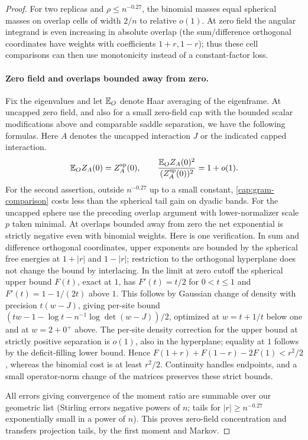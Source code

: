 \begin{proof}
For two replicas and \(\rho\le n^{-0.27}\), the binomial masses equal
spherical masses on overlap cells of width \(2/n\) to relative \(o(1)\). At
zero field the angular integrand is even increasing in absolute overlap (the
sum/difference orthogonal coordinates have weights with coefficients
\(1+r,1-r\)); thus these cell comparisons can then use monotonicity instead of
a constant-factor loss.

\paragraph{Zero field and overlaps bounded away from zero.}
Fix the eigenvalues and let \(\mathbb E_O\) denote Haar averaging of the eigenframe.
At uncapped zero field, and also for a small zero-field cap with the bounded
scalar modifications above and comparable saddle separation, we have the
following formulas. Here \(A\) denotes the uncapped interaction \(J\) or
the indicated capped interaction.
\[
 \mathbb E_O Z_A(0)=Z_A^{\rm sp}(0),\qquad
 \frac{\mathbb E_O Z_A(0)^2}{(Z_A^{\rm sp}(0))^2}=1+o(1).
\]
For the second assertion, outside \(n^{-0.27}\) up to a small constant,
\eqref{cap:gram-comparison} costs less than the spherical tail gain on dyadic
bands. For the uncapped sphere use the preceding overlap argument with
lower-normalizer scale \(p\) taken minimal. At overlaps bounded away from
zero the net exponential is strictly negative even with binomial weights.
Here is one verification. In sum and difference orthogonal coordinates,
upper exponents are bounded by the spherical free energies at \(1+|r|\) and
\(1-|r|\); restriction to the orthogonal hyperplane does not change the
bound by interlacing. In the limit at zero cutoff the spherical upper bound
\(F(t)\), exact at \(1\), has \(F'(t)=t/2\) for \(0<t\le1\) and
\(F'(t)=1-1/(2t)\) above \(1\). This follows by Gaussian change of density
with precision \(t(w-J)\), giving per-site bound
\((tw-1-\log t-n^{-1}\log\det(w-J))/2\), optimized at \(w=t+1/t\) below
one and at \(w=2+0^+\) above. The per-site density correction for the upper
bound at strictly positive separation is \(o(1)\), also in the hyperplane;
equality at \(1\) follows by the deficit-filling lower bound. Hence
\(F(1+r)+F(1-r)-2F(1)<r^2/2\), whereas the binomial cost is at least
\(r^2/2\). Continuity handles endpoints, and a small operator-norm change
of the matrices preserves these strict bounds.

All errors giving convergence of the moment ratio are summable over our
geometric list (Stirling errors negative powers of \(n\); tails for \(|r|\ge
n^{-0.27}\) exponentially small in a power of \(n\)). This proves zero-field
concentration and transfers projection tails, by the first moment and Markov.


\end{proof}

